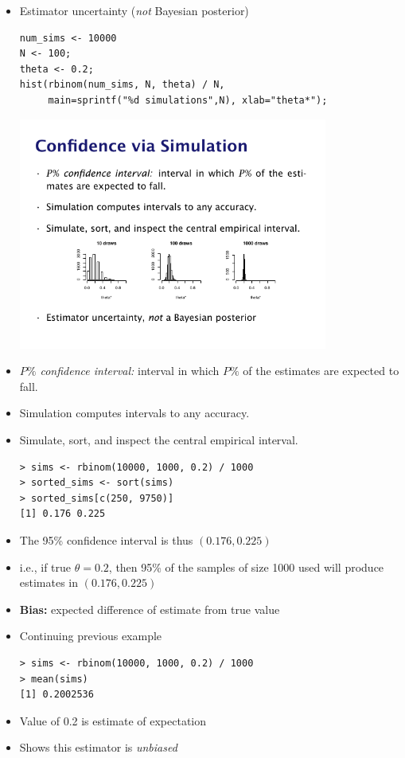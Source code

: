 \documentclass[10pt]{report}
\begin{document}
%
\begin{itemize}
\item Estimator uncertainty (\emph{not} Bayesian posterior)
{\small
\begin{Verbatim}
num_sims <- 10000
N <- 100;
theta <- 0.2;
hist(rbinom(num_sims, N, theta) / N,
     main=sprintf("%d simulations",N), xlab="theta*");
\end{Verbatim}
}
\vspace*{-12pt}
\begin{center}
\includegraphics[width=0.8\textwidth]{img/hist-10-100-1000.pdf}
\end{center}
\end{itemize}


%
\begin{itemize}
\item \emph{$P\%$ confidence interval:}  interval in which $P\%$ of the estimates are
expected to fall.
\item Simulation computes intervals to any accuracy.
\item Simulate, sort, and inspect the central empirical interval.
{\small
\begin{Verbatim}
> sims <- rbinom(10000, 1000, 0.2) / 1000
> sorted_sims <- sort(sims)
> sorted_sims[c(250, 9750)]
[1] 0.176 0.225
\end{Verbatim}
}
\item The 95\% confidence interval is thus $(0.176,0.225)$
\item i.e., if true $\theta = 0.2$, then 95\% of the samples of
  size 1000 used will produce estimates in $(0.176,0.225)$
\end{itemize}


%
\begin{itemize}
\item {\bfseries Bias:} expected difference of estimate from true value
\item Continuing previous example
{\small
\begin{Verbatim}
> sims <- rbinom(10000, 1000, 0.2) / 1000
> mean(sims)
[1] 0.2002536
\end{Verbatim}
}
\item Value of 0.2 is estimate of expectation
\item Shows this estimator is \emph{unbiased}
\end{itemize}
\end{document}
